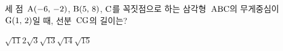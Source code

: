 세 점~$\mathrm{A}(-6,\,-2)$, $\mathrm{B}(5,\,8)$, $\mathrm{C}$를 꼭짓점으로 하는 삼각형~$\mathrm{ABC}$의 무게중심이 $\mathrm{G}(1,\,2)$일 때, 선분~$\mathrm{CG}$의 길이는?
\begin{choices32}{$\sqrt{11}$}{$2\sqrt{3}$}{$\sqrt{13}$}{$\sqrt{14}$}{$\sqrt{15}$}\end{choices32}
